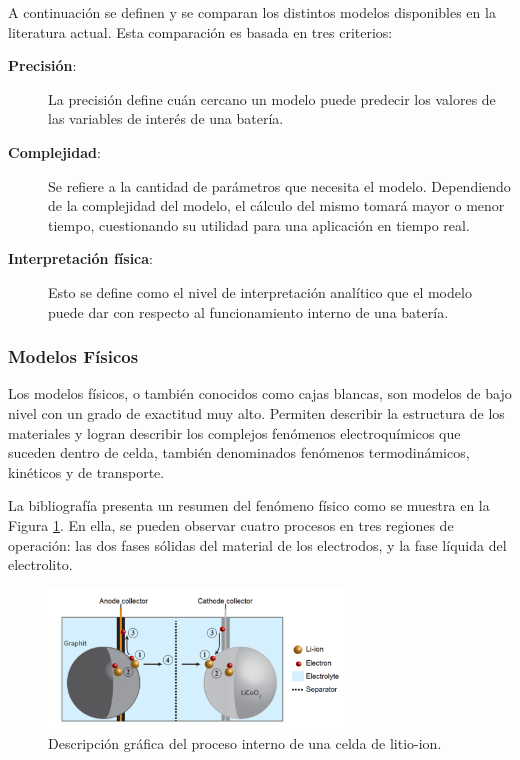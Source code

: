 \documentclass[10pt,a4paper]{article}
\begin{document}
A continuaci\'on se definen y se comparan los distintos modelos disponibles 
en la literatura actual. Esta comparaci\'on es basada en tres criterios:

\begin{description}
    \item [\textbf{Precisi\'on}:] La precisi\'on define cu\'an cercano un modelo
        puede predecir los valores de las variables de inter\'es de una
        bater\'ia.
    \item [\textbf{Complejidad}:] Se refiere a la cantidad de par\'ametros que
        necesita el modelo. Dependiendo de la complejidad del modelo, el 
        c\'alculo del mismo tomar\'a mayor o menor tiempo, cuestionando su 
        utilidad para una aplicaci\'on en tiempo real.
    \item [\textbf{Interpretaci\'on f\'isica}:] Esto se define como el nivel de
        interpretaci\'on anal\'itico que el modelo puede dar con respecto al
        funcionamiento interno de una bater\'ia.
\end{description}

\subsubsection{Modelos F\'isicos}\label{phyModel}

\noindent Los modelos f\'isicos, o tambi\'en conocidos como cajas blancas, son 
modelos de bajo nivel con un grado de exactitud muy alto. Permiten describir la 
estructura de los materiales y logran describir los complejos fen\'omenos 
electroqu\'imicos que suceden dentro de celda, tambi\'en denominados fen\'omenos 
termodin\'amicos, kin\'eticos y de transporte.

\noindent La bibliograf\'ia \cite{Schmidt2013} presenta un resumen del 
fen\'omeno f\'isico como se muestra en la Figura \ref{schmidt_fen_fis}. En ella, 
se pueden observar cuatro procesos en tres regiones de operaci\'on: las dos 
fases s\'olidas del material de los electrodos, y la fase l\'iquida del 
electrolito.

\begin{figure}[h!]
    \begin{center}
        \includegraphics[width=0.7\textwidth]{schmidt_proceso_fisico.png}
        \caption{Descripci\'on gr\'afica del proceso interno de una celda de litio-ion.}
        \label{schmidt_fen_fis}
    \end{center}
\end{figure}
\end{document}
